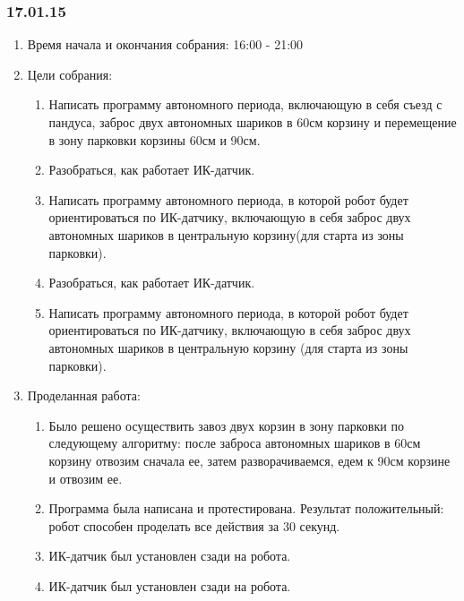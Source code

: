 \subsubsection{17.01.15}
\begin{enumerate}
	\item Время начала и окончания собрания: 16:00 - 21:00
	
	\item Цели собрания:
	\begin{enumerate}
		\item Написать программу автономного периода, включающую в себя съезд с пандуса, заброс двух автономных шариков в 60см корзину и перемещение в зону парковки корзины 60см и 90см.
		
		\item Разобраться, как работает ИК-датчик.
		
		\item Написать программу автономного периода, в которой робот будет ориентироваться по ИК-датчику, включающую в себя заброс двух автономных шариков в центральную корзину(для старта из зоны парковки).
		
		\item Разобраться, как работает ИК-датчик.
		
		\item Написать программу автономного периода, в которой робот будет ориентироваться по ИК-датчику, включающую в себя заброс двух автономных шариков в центральную корзину (для старта из зоны парковки).
	\end{enumerate}
	\item Проделанная работа:
	\begin{enumerate}
		\item Было решено осуществить завоз двух корзин в зону парковки по следующему алгоритму: после заброса автономных шариков в 60см корзину отвозим сначала ее, затем разворачиваемся, едем к 90см корзине и отвозим ее.
		
		\item Программа была написана и протестирована. Результат положительный: робот способен проделать все действия за 30 секунд.
		
		\item  ИК-датчик был установлен сзади на робота.
		
		\item  ИК-датчик был установлен сзади на робота.


\end{enumerate}
\end{enumerate}
